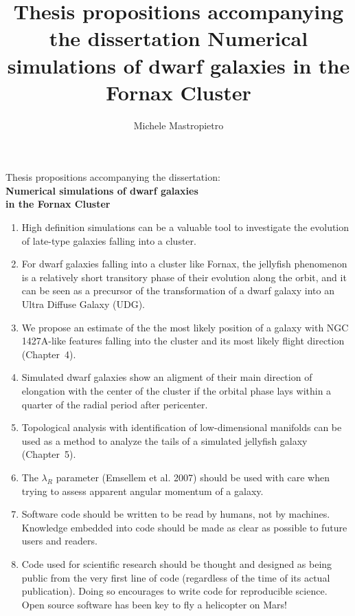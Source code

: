 \documentclass[fontsize=11pt]{scrartcl}
\title{Thesis propositions accompanying the dissertation \textbf{Numerical simulations of dwarf galaxies in the Fornax Cluster}}
\author{Michele Mastropietro}
\begin{document}

  \begin{center}
Thesis propositions accompanying the dissertation: \\[1ex]
    \textbf{Numerical simulations of dwarf galaxies \\ in the Fornax Cluster}

  \end{center}


\pagestyle{empty}
\begin{enumerate}
  \item High definition simulations can be a valuable tool to investigate the evolution of late-type galaxies falling into a cluster.
  \item For dwarf galaxies falling into a cluster like Fornax, the jellyfish phenomenon is a relatively short transitory phase of their evolution along the orbit, and it can be seen as a precursor of the transformation of a dwarf galaxy into an Ultra Diffuse Galaxy (UDG).
  \item We propose an estimate of the the most likely position of a galaxy with NGC 1427A-like features falling into the cluster and its most likely flight direction (Chapter~4).
  \item Simulated dwarf galaxies show an aligment of their main direction of elongation with the center of the cluster if the orbital phase lays within a quarter of the radial period after pericenter.
  \item Topological analysis with identification of low-dimensional manifolds can be used as a method to analyze the tails of a simulated jellyfish galaxy (Chapter~5).
  \item The $\lambda_R$ parameter (Emsellem et al. 2007)
  should be used with care when trying to assess apparent angular momentum of a galaxy.
  \item Software code should be written to be read by humans, not by machines. Knowledge embedded into code should be made as clear as possible to future users and readers.
  \item Code used for scientific research should be thought and designed as being public from the very first line of code (regardless of the time of its actual publication). Doing so encourages to write code for reproducible science. Open source software has been key to fly a helicopter on Mars!


\end{enumerate}
\end{document}
